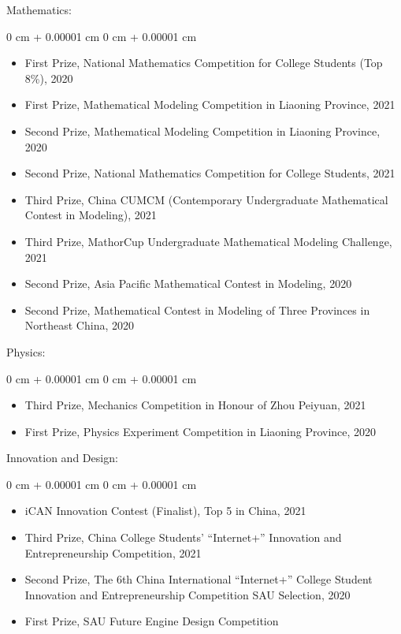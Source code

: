 \documentclass[10pt, letterpaper]{article}
\newenvironment{highlights}{
    \begin{itemize}[
        topsep=0.10 cm,
        parsep=0.10 cm,
        partopsep=0pt,
        itemsep=0pt,
        leftmargin=0 cm + 10pt
    ]
}{
    \end{itemize}
} %
\newenvironment{onecolentry}{
    \begin{adjustwidth}{
        0 cm + 0.00001 cm
    }{
        0 cm + 0.00001 cm
    }
}{
    \end{adjustwidth}
} %
\begin{document}
Mathematics:
    \vspace{0.10 cm}
    \begin{onecolentry}
        \begin{highlights}
            \item First Prize, National Mathematics Competition for College Students (Top 8\%), 2020
            \item First Prize, Mathematical Modeling Competition in Liaoning Province, 2021
            \item Second Prize, Mathematical Modeling Competition in Liaoning Province, 2020
            \item Second Prize, National Mathematics Competition for College Students, 2021
            \item Third Prize, China CUMCM (Contemporary Undergraduate Mathematical Contest in Modeling), 2021
            \item Third Prize, MathorCup Undergraduate Mathematical Modeling Challenge, 2021
            \item Second Prize, Asia Pacific Mathematical Contest in Modeling, 2020
            \item Second Prize, Mathematical Contest in Modeling of Three Provinces in Northeast China, 2020
        \end{highlights}
    \end{onecolentry}

    \vspace{0.2 cm}

Physics:

    \vspace{0.10 cm}
    \begin{onecolentry}
        \begin{highlights}
            \item Third Prize, Mechanics Competition in Honour of Zhou Peiyuan, 2021
            \item First Prize, Physics Experiment Competition in Liaoning Province, 2020
        \end{highlights}
    \end{onecolentry}

    \vspace{0.2 cm}

Innovation and Design:

    \vspace{0.10 cm}
    \begin{onecolentry}
        \begin{highlights}
            \item iCAN Innovation Contest (Finalist), Top 5 in China, 2021
            \item Third Prize, China College Students' “Internet+” Innovation and Entrepreneurship Competition, 2021
            \item Second Prize, The 6th China International “Internet+” College Student Innovation and Entrepreneurship Competition SAU Selection, 2020
            \item First Prize, SAU Future Engine Design Competition
        \end{highlights}
    \end{onecolentry}
\end{document}
